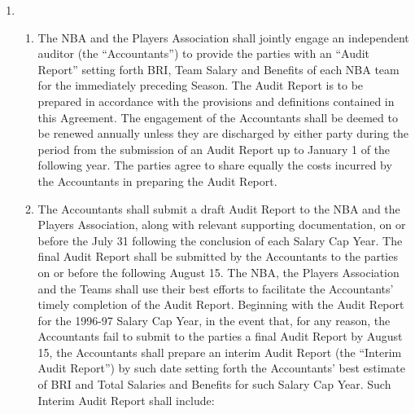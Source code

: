 \documentclass[
]{book}
\providecommand{\tightlist}{%
  \setlength{\itemsep}{0pt}\setlength{\parskip}{0pt}}
\begin{document}
\begin{enumerate}
\def\labelenumi{(\alph{enumi})}
\item
  \begin{enumerate}
  \def\labelenumii{(\arabic{enumii})}
  \tightlist
  \item
    The NBA and the Players Association shall jointly engage an independent auditor (the ``Accountants'') to provide the parties with an ``Audit Report'' setting forth BRI, Team Salary and Benefits of each NBA team for the immediately preceding Season. The Audit Report is to be prepared in accordance with the provisions and definitions contained in this Agreement. The engagement of the Accountants shall be deemed to be renewed annually unless they are discharged by either party during the period from the submission of an Audit Report up to January 1 of the following year. The parties agree to share equally the costs incurred by the Accountants in preparing the Audit Report.
  \item
    The Accountants shall submit a draft Audit Report to the NBA and the Players Association, along with relevant supporting documentation, on or before the July 31 following the conclusion of each Salary Cap Year. The final Audit Report shall be submitted by the Accountants to the parties on or before the following August 15. The NBA, the Players Association and the Teams shall use their best efforts to facilitate the Accountants' timely completion of the Audit Report. Beginning with the Audit Report for the 1996-97 Salary Cap Year, in the event that, for any reason, the Accountants fail to submit to the parties a final Audit Report by August 15, the Accountants shall prepare an interim Audit Report (the ``Interim Audit Report'') by such date setting forth the Accountants' best estimate of BRI and Total Salaries and Benefits for such Salary Cap Year. Such Interim Audit Report shall include:


\end{enumerate}
\end{enumerate}
\end{document}
